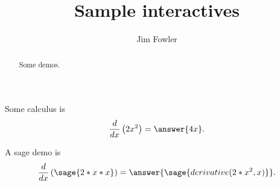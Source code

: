 \documentclass{ximera}
\title{Sample interactives}
\author{Jim Fowler}
\begin{document}
\begin{abstract}
Some demos.
\end{abstract}
\maketitle

\begin{problem}
  Some calculus is
  \[
    \frac{d}{dx} \left( 2x^2 \right) = \answer{4x}.
  \]
\end{problem}

\begin{problem}
  A sage demo is
  \[
    \frac{d}{dx} \left( \sage{2*x*x} \right) =
      \answer{\sage{derivative(2*x^2,x)}}.
  \]
\end{problem}
\end{document}
